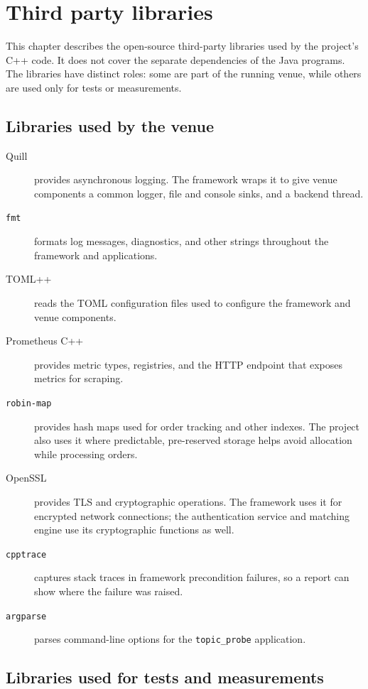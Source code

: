 \chapter{Third party libraries}
\label{ch:third_party_libraries}

This chapter describes the open-source third-party libraries used by the
project's C++ code. It does not cover the separate dependencies of the Java
programs. The libraries have distinct roles: some are part of the running
venue, while others are used only for tests or measurements.

\section{Libraries used by the venue}
\label{sec:third_party_libraries_venue}

\begin{description}
  \item[Quill] provides asynchronous logging. The framework wraps it to give
    venue components a common logger, file and console sinks, and a backend
    thread.
  \item[\texttt{fmt}] formats log messages, diagnostics, and other strings
    throughout the framework and applications.
  \item[TOML++] reads the TOML configuration files used to configure the
    framework and venue components.
  \item[Prometheus C++] provides metric types, registries, and the HTTP
    endpoint that exposes metrics for scraping.
  \item[\texttt{robin-map}] provides hash maps used for order tracking and
    other indexes. The project also uses it where predictable, pre-reserved
    storage helps avoid allocation while processing orders.
  \item[OpenSSL] provides TLS and cryptographic operations. The framework
    uses it for encrypted network connections; the authentication service and
    matching engine use its cryptographic functions as well.
  \item[\texttt{cpptrace}] captures stack traces in framework precondition
    failures, so a report can show where the failure was raised.
  \item[\texttt{argparse}] parses command-line options for the
    \texttt{topic\_probe} application.
\end{description}

\section{Libraries used for tests and measurements}
\label{sec:third_party_libraries_tests}

